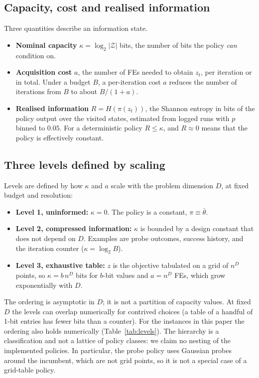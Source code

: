 \documentclass[conference]{IEEEtran}
\begin{document}
\subsection{Capacity, cost and realised information}
Three quantities describe an information state.
\begin{itemize}
\item \textbf{Nominal capacity} $\kappa=\log_2|\mathcal{Z}|$ bits, the number of bits the policy \emph{can} condition on.
\item \textbf{Acquisition cost} $a$, the number of FEs needed to obtain $z_t$, per iteration or in total. Under a budget $B$, a per-iteration cost $a$ reduces the number of iterations from $B$ to about $B/(1+a)$.
\item \textbf{Realised information} $R=H(\pi(z_t))$, the Shannon entropy in bits of the policy output over the visited states, estimated from logged runs with $p$ binned to $0.05$. For a deterministic policy $R\le\kappa$, and $R\approx0$ means that the policy is effectively constant.
\end{itemize}

\subsection{Three levels defined by scaling}\label{sec:levels}
Levels are defined by how $\kappa$ and $a$ scale with the problem dimension $D$, at fixed budget and resolution:
\begin{itemize}
\item \textbf{Level 1, uninformed:} $\kappa=0$. The policy is a constant, $\pi\equiv\bar\theta$.
\item \textbf{Level 2, compressed information:} $\kappa$ is bounded by a design constant that does not depend on $D$. Examples are probe outcomes, success history, and the iteration counter ($\kappa=\log_2B$).
\item \textbf{Level 3, exhaustive table:} $z$ is the objective tabulated on a grid of $n^D$ points, so $\kappa=b\,n^D$ bits for $b$-bit values and $a=n^D$ FEs, which grow exponentially with $D$.
\end{itemize}
The ordering is asymptotic in $D$; it is not a partition of capacity values. At fixed $D$ the levels can overlap numerically for contrived choices (a table of a handful of 1-bit entries has fewer bits than a counter). For the instances in this paper the ordering also holds numerically (Table~\ref{tab:levels}). The hierarchy is a classification and not a lattice of policy classes: we claim no nesting of the implemented policies. In particular, the probe policy uses Gaussian probes around the incumbent, which are not grid points, so it is not a special case of a grid-table policy.
\end{document}
